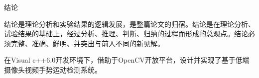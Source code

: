 
\begin{center}
\heiti{}结\hspace{2em}论
\end{center}%

结论是理论分析和实验结果的逻辑发展，是整篇论文的归宿。结论是在理论分析、试验结果的基础上，经过分析、推理、判断、归纳的过程而形成的总观点。结论必须完整、准确、鲜明、并突出与前人不同的新见解。

在Visual c++6.0开发环境下，借助于OpenCV开放平台，设计并实现了基于低端摄像头视频手势运动检测系统。
